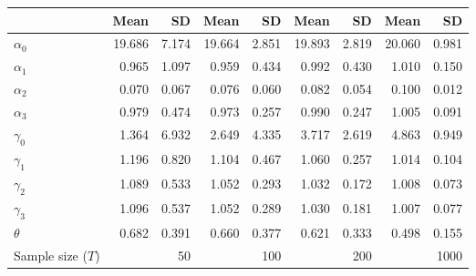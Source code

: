 
\begin{tabular}[t]{lrrrrrrrr}
\toprule
  & Mean & SD & Mean  & SD  & Mean   & SD   & Mean    & SD   \\
\midrule
$\alpha_{0}$ & 19.686 & 7.174 & 19.664 & 2.851 & 19.893 & 2.819 & 20.060 & 0.981\\
$\alpha_{1}$ & 0.965 & 1.097 & 0.959 & 0.434 & 0.992 & 0.430 & 1.010 & 0.150\\
$\alpha_{2}$ & 0.070 & 0.067 & 0.076 & 0.060 & 0.082 & 0.054 & 0.100 & 0.012\\
$\alpha_{3}$ & 0.979 & 0.474 & 0.973 & 0.257 & 0.990 & 0.247 & 1.005 & 0.091\\
$\gamma_{0}$ & 1.364 & 6.932 & 2.649 & 4.335 & 3.717 & 2.619 & 4.863 & 0.949\\
$\gamma_{1}$ & 1.196 & 0.820 & 1.104 & 0.467 & 1.060 & 0.257 & 1.014 & 0.104\\
$\gamma_{2}$ & 1.089 & 0.533 & 1.052 & 0.293 & 1.032 & 0.172 & 1.008 & 0.073\\
$\gamma_{3}$ & 1.096 & 0.537 & 1.052 & 0.289 & 1.030 & 0.181 & 1.007 & 0.077\\
$\theta$ & 0.682 & 0.391 & 0.660 & 0.377 & 0.621 & 0.333 & 0.498 & 0.155\\
Sample size ($T$) &  & 50 &  & 100 &  & 200 &  & 1000\\
\bottomrule
\end{tabular}
